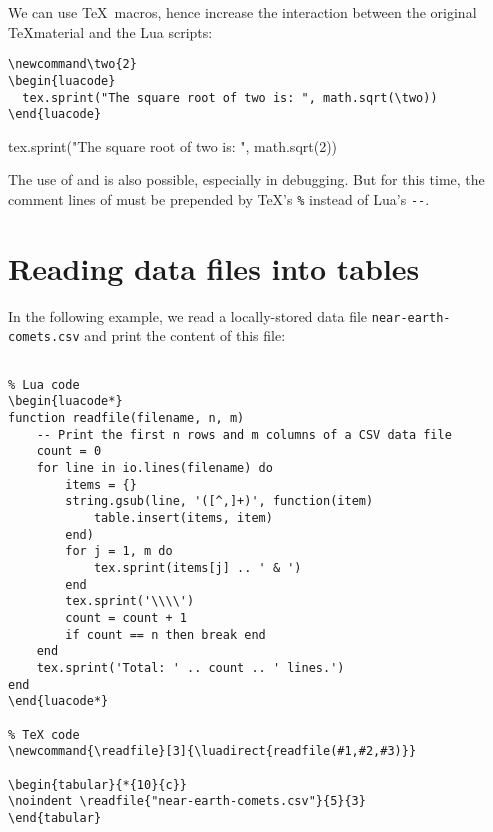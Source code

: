 \documentclass[a4paper]{article}
\begin{document}
\noindent {}

\medskip

We can use \TeX\, macros, hence increase the interaction between the original \TeX material and the Lua scripts:

\begin{verbatim}
\newcommand\two{2}
\begin{luacode}
  tex.sprint("The square root of two is: ", math.sqrt(\two))
\end{luacode}
\end{verbatim}

\newcommand\two{2}
\begin{luacode}
  tex.sprint("The square root of two is: ", math.sqrt(\two))
\end{luacode}

\medskip

The use of \texttt{\string\luadirect} and \texttt{\string\luaexec} is also possible, especially in debugging. But for this time, the comment lines of must be prepended by \TeX's \verb#%# instead of Lua's \verb#--#. 

\section{Reading data files into tables}

In the following example, we read a locally-stored data file \verb#near-earth-comets.csv# and print the content of this file:

\begin{verbatim}
    
% Lua code
\begin{luacode*}
function readfile(filename, n, m)
    -- Print the first n rows and m columns of a CSV data file
    count = 0
    for line in io.lines(filename) do
	    items = {}
	    string.gsub(line, '([^,]+)', function(item)
            table.insert(items, item)
        end)
	    for j = 1, m do
            tex.sprint(items[j] .. ' & ')
        end
        tex.sprint('\\\\')
        count = count + 1
        if count == n then break end
    end
    tex.sprint('Total: ' .. count .. ' lines.')
end 
\end{luacode*}

% TeX code
\newcommand{\readfile}[3]{\luadirect{readfile(#1,#2,#3)}}

\begin{tabular}{*{10}{c}}
\noindent \readfile{"near-earth-comets.csv"}{5}{3}
\end{tabular}

\end{verbatim}
\end{document}
